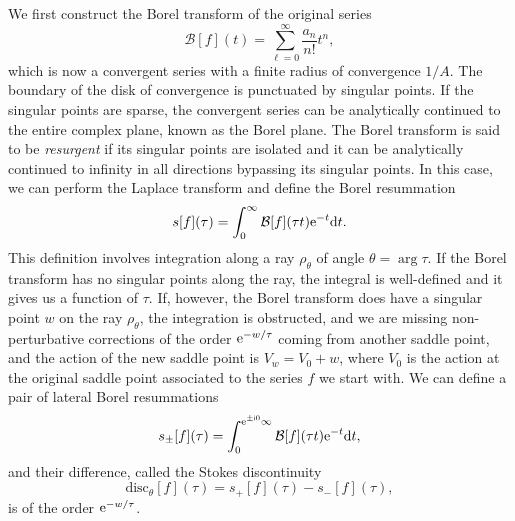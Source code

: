 \documentclass[a4paper,11pt]{article}	%
\def\mc{\mathcal}
\newcommand{\re}{{\rm e}}
\newcommand{\ri}{{\mathsf{i}}}
\newcommand{\rd}{{\rm d}}
\begin{document}
We first construct the Borel transform of the
original series
\begin{equation}
  \mc{B}[f](t) = \sum_{\ell=0}^\infty \frac{a_n}{n!} t^n,
\end{equation}
which is now a convergent series with a finite radius of convergence
$1/A$.  The boundary of the disk of convergence is punctuated by
singular points.  If the singular points are sparse, the convergent
series can be analytically continued to the entire complex plane,
known as the Borel plane.  The Borel transform is said to be
\emph{resurgent} if its singular points are isolated and it can be
analytically continued to infinity in all directions bypassing its
singular points.  In this case, we can perform the Laplace transform
and define the Borel resummation
\begin{equation}
  s[f](\tau) = \int_0^\infty \mc{B}[f](\tau t) \re^{-t}\rd t.
\end{equation}
This definition involves integration along a ray $\rho_\theta$ of
angle $\theta =\arg\tau$.  If the Borel transform has no singular
points along the ray, the integral is well-defined and it gives us a
function of $\tau$.  If, however, the Borel transform does have a
singular point $w$ on the ray $\rho_\theta$, the integration is
obstructed, and we are missing non-perturbative corrections of the
order $\re^{-w/\tau}$ coming from another saddle point, and the action
of the new saddle point is $V_w = V_0 + w$, where $V_0$ is the action
at the original saddle point associated to the series $f$ we start
with.
%
We can define a pair of lateral Borel resummations
\begin{equation}
  s_{\pm}[f](\tau) = \int_0^{\re^{\pm \ri 0}\infty}
  \mc{B}[f](\tau t)\re^{-t} \rd t,
\end{equation}
and their difference, called the Stokes discontinuity
\begin{equation}
  \text{disc}_\theta[f](\tau) = s_{+}[f](\tau) - s_{-}[f](\tau),
\end{equation}
is of the order $\re^{-w/\tau}$.
\end{document}
